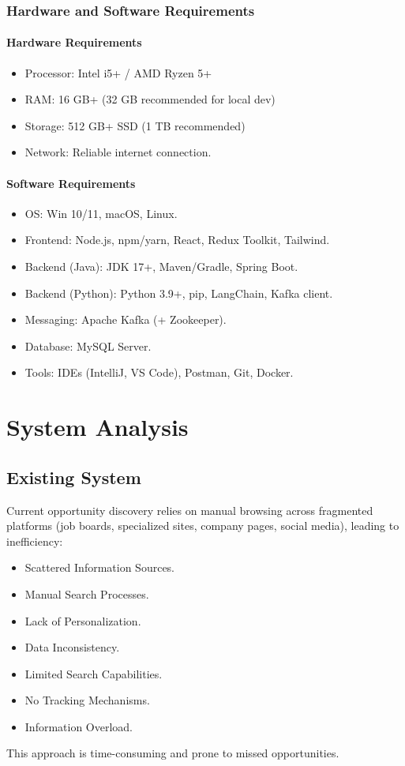 \documentclass[12pt, a4paper]{report}
\begin{document}
\subsection{Hardware and Software Requirements}
\subsubsection{Hardware Requirements}
\begin{itemize}
    \item Processor: Intel i5+ / AMD Ryzen 5+
    \item RAM: 16 GB+ (32 GB recommended for local dev)
    \item Storage: 512 GB+ SSD (1 TB recommended)
    \item Network: Reliable internet connection.
\end{itemize}

\subsubsection{Software Requirements}
\begin{itemize}
    \item OS: Win 10/11, macOS, Linux.
    \item Frontend: Node.js, npm/yarn, React, Redux Toolkit, Tailwind.
    \item Backend (Java): JDK 17+, Maven/Gradle, Spring Boot.
    \item Backend (Python): Python 3.9+, pip, LangChain, Kafka client.
    \item Messaging: Apache Kafka (+ Zookeeper).
    \item Database: MySQL Server.
    \item Tools: IDEs (IntelliJ, VS Code), Postman, Git, Docker.
\end{itemize}

\chapter{System Analysis}

\section{Existing System}
Current opportunity discovery relies on manual browsing across fragmented platforms (job boards, specialized sites, company pages, social media), leading to inefficiency:
\begin{itemize}
    \item Scattered Information Sources.
    \item Manual Search Processes.
    \item Lack of Personalization.
    \item Data Inconsistency.
    \item Limited Search Capabilities.
    \item No Tracking Mechanisms.
    \item Information Overload.
\end{itemize}
This approach is time-consuming and prone to missed opportunities.
\end{document}
